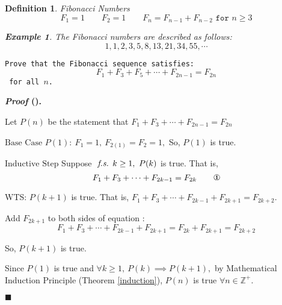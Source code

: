 \documentclass[12pt,a4paper]{article}
\newtheorem{df}{Definition}[subsection]
\newtheorem{eg}{Example}[subsection]
\newcounter{nprf}[subsection]
\newenvironment*{prf}{\par\indent\textbf{\textit{Proof} (\stepcounter{nprf}\thenprf). }\par }{\par\hfill $\blacksquare$\par}
\def\Z{{\mathbb{Z}}}
\def\Zp{{\Z^{+}}}
\def\fs{\emph{ f.s. }}
\begin{document}
\begin{df}{Fibonacci Numbers}\[F_1=1\qquad F_2=1\qquad F_n=F_{n-1}+F_{n-2}\texttt{ for }n\geq3\]
	\begin{eg}
		The \textit{Fibonacci numbers} are described as follows: \[1,1,2,3,5,8,13,21,34,55,\cdots\]	
	\end{eg}
\end{df}
\begin{framed}
\noindent\texttt{Prove that the Fibonacci sequence satisfies: \[F_1+F_3+F_5+\cdots+F_{2n-1}=F_{2n}\] for all $n$.}
\begin{prf}
	Let $P(n)$ be the statement that $F_1+F_3+\cdots+F_{2n-1}=F_{2n}$\par$\boxed{\text{Base Case}}$ $P(1):\ F_1=1,\ F_{2(1)}=F_2=1,$ So, $P(1)$ is true. \par$\boxed{\text{Inductive Step}}$ Suppose $\fs k\geq1,\ P(k)$ is true. That is, \[F_1+F_3+\cdots+F_{2k-1}=F_{2k}\qquad\text{\ding{172}}\]\par\hspace{5mm} WTS: $P(k+1)$ is true. That is, $F_1+F_3+\cdots+F_{2k-1}+F_{2k+1}=F_{2k+2}.$\par\hspace{5mm} Add $F_{2k+1}$ to both sides of equation : \[F_1+F_3+\cdots+F_{2k-1}+F_{2k+1}=F_{2k}+F_{2k+1}=F_{2k+2}\]\par\hspace{5mm} So, $P(k+1)$ is true.\par Since $P(1)$ is true and $\forall k\geq1,\ P(k)\implies P(k+1),$ by Mathematical Induction Principle (Theorem \ref{induction}), $P(n)$ is true $\forall n\in\Zp.$
\end{prf}
\end{framed}
\end{document}
